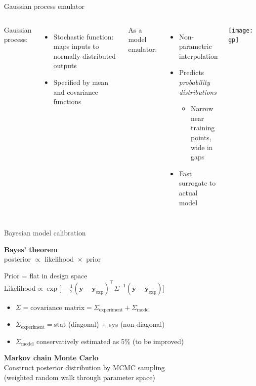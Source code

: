 \documentclass{beamer}
\newcommand{\tran}{^\intercal}
\begin{document}
\begin{frame}{Gaussian process emulator}
  \vspace{1em}
  \begin{columns}[c]
    Gaussian process:
    \begin{itemize}
      \item Stochastic function: maps inputs to normally-distributed outputs
      \item Specified by mean and covariance functions
    \end{itemize}
    \bigskip
    As a model emulator:
    \begin{itemize}
      \item Non-parametric interpolation
      \item Predicts \emph{probability distributions}
        \begin{itemize}
          \item Narrow near training points, \\ wide in gaps
        \end{itemize}
      \item Fast surrogate to actual model
    \end{itemize}
    \texttt{[image: gp]}
  \end{columns}
\end{frame}

\newcommand{\ydiff}{(\mathbf y - \mathbf y_\text{exp})}

\begin{frame}{Bayesian model calibration}
  \begin{center}
    \textbf{Bayes' theorem} \\
    posterior ${}\propto{}$ likelihood ${}\times{}$ prior
  \end{center}
  Prior = flat in design space \\[1ex]
  Likelihood${} \propto \exp\bigl[ -\frac{1}{2} \ydiff\tran \Sigma^{-1} \ydiff \bigr]$ \\[.5ex]
  \begin{itemize}
    \setlength{\itemsep}{.8ex}
    \item $\Sigma = \text{covariance matrix} = \Sigma_\text{experiment} + \Sigma_\text{model}$
    \item $\Sigma_\text{experiment} = {}$stat (diagonal) + sys (non-diagonal)
    \item $\Sigma_\text{model}$ conservatively estimated as 5\% (to be improved)
  \end{itemize}
  \begin{center}
    \textbf{Markov chain Monte Carlo} \\[1ex]
    Construct posterior distribution by MCMC sampling \\
    (weighted random walk through parameter space)
  \end{center}
\end{frame}
\end{document}

